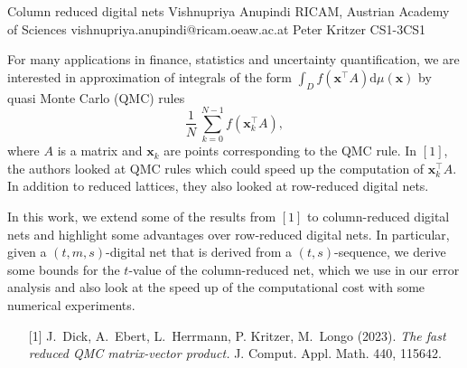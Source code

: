 \begin{talk}
  {Column reduced digital nets}%
  {Vishnupriya Anupindi}%
  {RICAM, Austrian Academy of Sciences}%
  {vishnupriya.anupindi@ricam.oeaw.ac.at}%
  {Peter Kritzer}%
{}{}{CS1-3}{CS1}

			
For many applications in finance, statistics and uncertainty quantification, we are interested in approximation of integrals of the form 
$\int_D f(\boldsymbol{x}^\top A) \mathrm{d} \mu(\boldsymbol{x}) $
by quasi Monte Carlo (QMC) rules
$$\frac{1}{N}\, \sum_{k=0}^{N-1} f(\boldsymbol{x}_k^\top A),$$
where $A$ is a matrix and $\boldsymbol{x}_k$ are points corresponding to the QMC rule. In $[1]$, the authors looked at QMC rules which could speed up the computation of $\boldsymbol{x}_k^\top A$. In addition to reduced lattices, they also looked at row-reduced digital nets. 

In this work, we extend some of the results from $[1]$ to column-reduced digital nets and highlight some advantages over row-reduced digital nets. In particular, 
given a $(t,m,s)$-digital net that is derived from a $(t,s)$-sequence, we derive some bounds for the $t$-value of the column-reduced net, which we use in our error analysis and also look at the speed up of the computational cost with some numerical experiments. 

\medskip


\begin{enumerate}
	\item[{[1]}] J.~Dick, A.~Ebert, L.~Herrmann, P. Kritzer,  M.~Longo (2023). {\it The fast reduced QMC matrix-vector product.} J. Comput. Appl. Math. 440, 115642.
\end{enumerate}



\end{talk}

